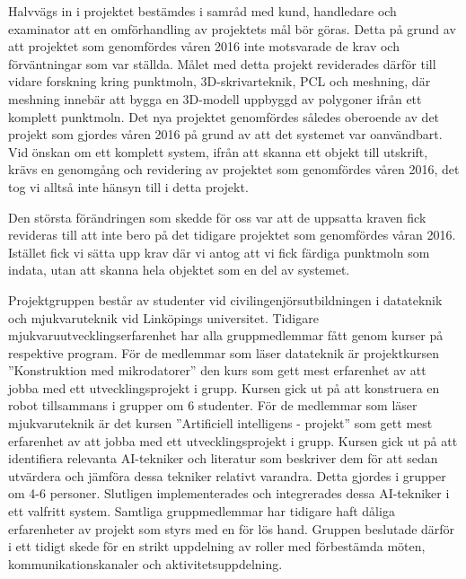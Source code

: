 Halvvägs in i projektet bestämdes i samråd med kund, handledare och examinator att en omförhandling av projektets mål bör göras. Detta på grund av att projektet som genomfördes våren 2016 inte motsvarade de krav och förväntningar som var ställda. Målet med detta projekt reviderades därför till vidare forskning kring punktmoln, 3D-skrivarteknik, PCL och meshning, där meshning innebär att bygga en 3D-modell uppbyggd av polygoner ifrån ett komplett punktmoln. Det nya projektet genomfördes således oberoende av det projekt som gjordes våren 2016 på grund av att det systemet var oanvändbart. Vid önskan om ett komplett system, ifrån att skanna ett objekt till utskrift, krävs en genomgång och revidering av projektet som genomfördes våren 2016, det tog vi alltså inte hänsyn till i detta projekt. 

Den största förändringen som skedde för oss var att de uppsatta kraven fick revideras till att inte bero på det tidigare projektet som genomfördes våran 2016. Istället fick vi sätta upp krav där vi antog att vi fick färdiga punktmoln som indata, utan att skanna hela objektet som en del av systemet. 

Projektgruppen består av studenter vid civilingenjörsutbildningen i datateknik och mjukvaruteknik vid Linköpings universitet. Tidigare mjukvaruutvecklingserfarenhet har alla gruppmedlemmar fått genom kurser på respektive program. För de medlemmar som läser datateknik är projektkursen ”Konstruktion med mikrodatorer” den kurs som gett mest erfarenhet av att jobba med ett utvecklingsprojekt i grupp. Kursen gick ut på att konstruera en robot tillsammans i grupper om 6 studenter. För de medlemmar som läser mjukvaruteknik är det kursen ”Artificiell intelligens - projekt” som gett mest erfarenhet av att jobba med ett utvecklingsprojekt i grupp. Kursen gick ut på att identifiera relevanta AI-tekniker och literatur som beskriver dem för att sedan utvärdera och jämföra dessa tekniker relativt varandra. Detta gjordes i grupper om 4-6 personer. Slutligen implementerades och integrerades dessa AI-tekniker i ett valfritt system. Samtliga gruppmedlemmar har tidigare haft dåliga erfarenheter av projekt som styrs med en för lös hand. Gruppen beslutade därför i ett tidigt skede för en strikt uppdelning av roller med förbestämda möten, kommunikationskanaler och aktivitetsuppdelning.

